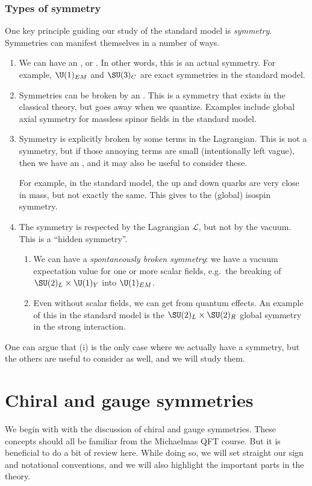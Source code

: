 \documentclass[a4paper]{article}
\begin{document}
\subsubsection*{Types of symmetry}
One key principle guiding our study of the standard model is \emph{symmetry}. Symmetries can manifest themselves in a number of ways.
\begin{enumerate}
  \item We can have an , or . In other words, this is an actual symmetry. For example, $\U(1)_{EM}$ and $\SU(3)_C$ are exact symmetries in the standard model.
  \item Symmetries can be broken by an . This is a symmetry that exists in the classical theory, but goes away when we quantize. Examples include global axial symmetry for massless spinor fields in the standard model.
  \item Symmetry is explicitly broken by some terms in the Lagrangian. This is not a symmetry, but if those annoying terms are small (intentionally left vague), then we have an , and it may also be useful to consider these.

    For example, in the standard model, the up and down quarks are very close in mass, but not exactly the same. This gives to the (global) isospin symmetry.
  \item The symmetry is respected by the Lagrangian $\mathcal{L}$, but not by the vacuum. This is a ``hidden symmetry''.
    \begin{enumerate}
      \item We can have a \emph{spontaneously broken symmetry}: we have a vacuum expectation value for one or more scalar fields, e.g.\ the breaking of $\SU(2)_L \times \U(1)_Y$ into $\U(1)_{EM}$.
      \item Even without scalar fields, we can get  from quantum effects. An example of this in the standard model is the $\SU(2)_L \times \SU(2)_R$ global symmetry in the strong interaction.
    \end{enumerate}
\end{enumerate}
One can argue that (i) is the only case where we actually have a symmetry, but the others are useful to consider as well, and we will study them.

\section{Chiral and gauge symmetries}
We begin with with the discussion of chiral and gauge symmetries. These concepts should all be familiar from the Michaelmas QFT course. But it is beneficial to do a bit of review here. While doing so, we will set straight our sign and notational conventions, and we will also highlight the important parts in the theory.
\end{document}
